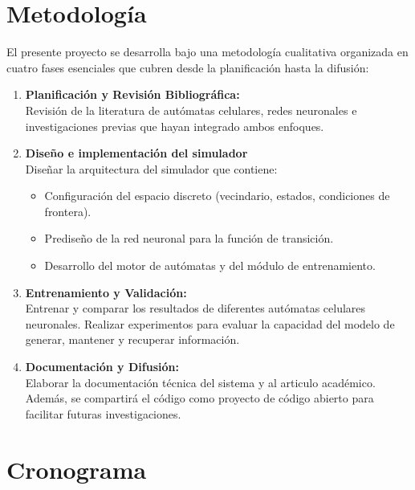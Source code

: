 \documentclass[letterpaper,10pt,oneside]{article}
\begin{document}
	\section{Metodología}
	
	El presente proyecto se desarrolla bajo una metodología cualitativa organizada en cuatro fases esenciales que cubren desde la planificación hasta la difusión: 
	
	\begin{enumerate}
		\item \textbf{Planificación y Revisión Bibliográfica:} \\
		Revisión de la literatura de autómatas celulares, redes neuronales e investigaciones previas que hayan integrado ambos enfoques.
		
		\item \textbf{Diseño e implementación del simulador} \\
		Diseñar la arquitectura del simulador que contiene:
		\begin{itemize}
			\item Configuración del espacio discreto (vecindario, estados, condiciones de frontera).
			\item Prediseño de la red neuronal para la función de transición.
			\item Desarrollo del motor de autómatas y del módulo de entrenamiento.
		\end{itemize}
		
		\item \textbf{Entrenamiento y Validación:} \\
		Entrenar y comparar los resultados de diferentes autómatas celulares neuronales. Realizar experimentos para evaluar la capacidad del modelo de generar, mantener y recuperar información.
		
		\item \textbf{Documentación y Difusión:} \\
		Elaborar la documentación técnica del sistema y al articulo académico. Además, se compartirá el código como proyecto de código abierto para facilitar futuras investigaciones.
	\end{enumerate}
	
	\section{Cronograma}
	
\end{document}
